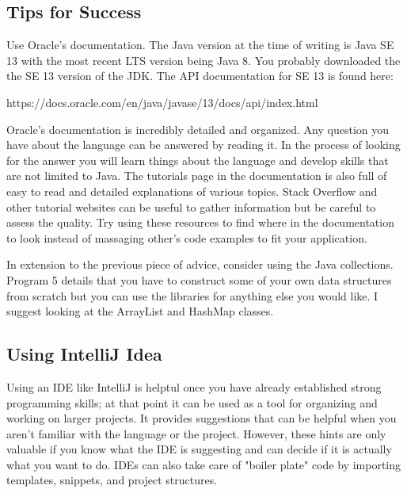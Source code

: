 \documentclass[../../main.tex]{subfiles}
\begin{document}
\subsection{Tips for Success}
Use Oracle's documentation. The Java version at the time of writing is Java
SE 13 with the most recent LTS version being Java 8.
You probably downloaded the the SE 13 version of the JDK. The API
documentation for SE 13 is found here:

\vspace{.5em}

https://docs.oracle.com/en/java/javase/13/docs/api/index.html

\vspace{.5em}

Oracle's documentation is incredibly detailed and organized. Any question you have about the language can be answered by
reading it. In the process of looking for the answer you will learn things about the language and develop skills that are not
limited to Java. The tutorials page in the documentation is also full of easy to read and detailed explanations of various topics.
Stack Overflow and other tutorial websites can be useful to gather information but be careful to assess the quality. Try using
these resources to find where in the documentation to look instead of massaging other's code examples to fit your application.

\vspace{.5em}

In extension to the previous piece of advice, consider using the Java collections. Program 5 details that you have to construct
some of your own data structures from scratch but you can use the libraries for anything else you would like. I suggest looking
at the ArrayList and HashMap classes.

\subsection{Using IntelliJ Idea}
Using an IDE like IntelliJ is helptul once you have already established strong programming skills; at
that point it can be used as a tool for organizing and working on larger projects. It provides suggestions
that can be helpful when you aren't familiar with the language or the project. However, these hints are
only valuable if you know what the IDE is suggesting and can decide if it is actually what you want to do.
IDEs can also take care of "boiler plate" code by importing templates, snippets, and project structures.
\end{document}
